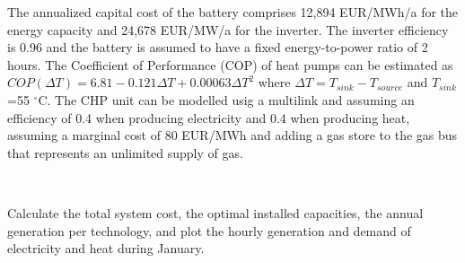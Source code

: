 \documentclass[10pt]{article}
\newenvironment{problem}[2][Problem]{\begin{trivlist}
\item[\hskip \labelsep {\bfseries #1}\hskip \labelsep {\bfseries #2.}]}{\end{trivlist}}
\begin{document}
\begin{problem}{11.1}
The annualized capital cost of the battery comprises  12,894 EUR/MWh/a for the energy capacity and 24,678 EUR/MW/a for the inverter. The inverter efficiency is 0.96 and the battery is assumed to have a fixed energy-to-power ratio of 2 hours. The Coefficient of Performance (COP) of heat pumps can be estimated as $COP (\Delta T) = 6.81 - 0.121 \Delta T + 0.00063 \Delta T^2$ where  $\Delta T = T_{sink} - T_{source}$ and $T_{sink}$=55 $^{\circ}$C. The  CHP unit can be modelled usig a multilink and assuming an efficiency of 0.4 when producing electricity and 0.4 when producing heat, assuming a marginal cost of 80 EUR/MWh and adding a gas store to the gas bus that represents an unlimited supply of gas.

\

Calculate the total system cost, the optimal installed capacities, the annual generation per technology, and plot the hourly generation and demand of electricity and heat during January.

\


\end{problem}

\
\end{document}
